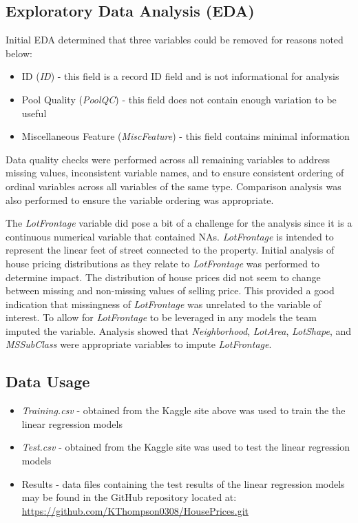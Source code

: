 \documentclass[american,]{article}
\providecommand{\tightlist}{%
  \setlength{\itemsep}{0pt}\setlength{\parskip}{0pt}}
\begin{document}
\subsection{Exploratory Data Analysis
(EDA)}\label{exploratory-data-analysis-eda}

Initial EDA determined that three variables could be removed for reasons
noted below:

\begin{itemize}
\tightlist
\item
  ID (\emph{ID}) - this field is a record ID field and is not
  informational for analysis
\item
  Pool Quality (\emph{PoolQC}) - this field does not contain enough
  variation to be useful
\item
  Miscellaneous Feature (\emph{MiscFeature}) - this field contains
  minimal information
\end{itemize}

Data quality checks were performed across all remaining variables to
address missing values, inconsistent variable names, and to ensure
consistent ordering of ordinal variables across all variables of the
same type. Comparison analysis was also performed to ensure the variable
ordering was appropriate.

The \emph{LotFrontage} variable did pose a bit of a challenge for the
analysis since it is a continuous numerical variable that contained NAs.
\emph{LotFrontage} is intended to represent the linear feet of street
connected to the property. Initial analysis of house pricing
distributions as they relate to \emph{LotFrontage} was performed to
determine impact. The distribution of house prices did not seem to
change between missing and non-missing values of selling price. This
provided a good indication that missingness of \emph{LotFrontage} was
unrelated to the variable of interest. To allow for \emph{LotFrontage}
to be leveraged in any models the team imputed the variable. Analysis
showed that \emph{Neighborhood}, \emph{LotArea}, \emph{LotShape}, and
\emph{MSSubClass} were appropriate variables to impute
\emph{LotFrontage}.

\subsection{Data Usage}\label{data-usage}

\begin{itemize}
\item
  \emph{Training.csv} - obtained from the Kaggle site above was used to
  train the the linear regression models
\item
  \emph{Test.csv} - obtained from the Kaggle site was used to test the
  linear regression models
\item
  Results - data files containing the test results of the linear
  regression models may be found in the GitHub repository located at:
  \url{https://github.com/KThompson0308/HousePrices.git}
\end{itemize}
\end{document}
